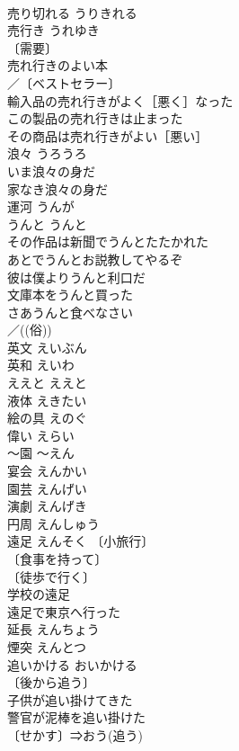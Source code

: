 \documentclass[8pt]{extreport}
\begin{document}
\begin{CJK}{UTF8}{min}
\\	売り切れる	うりきれる	
\\	売行き	うれゆき	
\\	〔需要〕
\\	売れ行きのよい本 
\\	／〔ベストセラー〕
\\	輸入品の売れ行きがよく［悪く］なった 
\\	この製品の売れ行きは止まった 
\\	その商品は売れ行きがよい［悪い］ 
\\	浪々	うろうろ	
\\	いま浪々の身だ 
\\	家なき浪々の身だ 
\\	運河	うんが	
\\	うんと	うんと	
\\	その作品は新聞でうんとたたかれた 
\\	あとでうんとお説教してやるぞ 
\\	彼は僕よりうんと利口だ 
\\	文庫本をうんと買った 
\\	さあうんと食べなさい 
\\	／((俗)) 
\\	英文	えいぶん	
\\	英和	えいわ	
\\	ええと	ええと	
\\	液体	えきたい	
\\	絵の具	えのぐ	
\\	偉い	えらい	
\\	～園	～えん	
\\	宴会	えんかい	
\\	園芸	えんげい	
\\	演劇	えんげき	
\\	円周	えんしゅう	
\\	遠足	えんそく	〔小旅行〕
\\	〔食事を持って〕
\\	〔徒歩で行く〕
\\	学校の遠足 
\\	遠足で東京へ行った 
\\	延長	えんちょう	
\\	煙突	えんとつ	
\\	追いかける	おいかける	
\\	〔後から追う〕
\\	子供が追い掛けてきた 
\\	警官が泥棒を追い掛けた 
\\	〔せかす〕⇒おう(追う)

\end{CJK}
\end{document}
